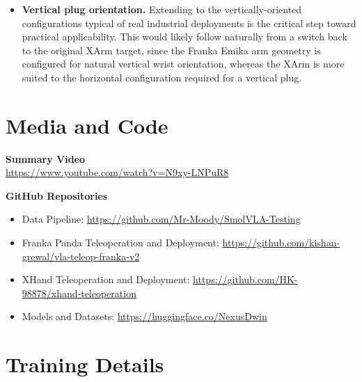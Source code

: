 \documentclass[conference]{IEEEtran}
\begin{document}
\begin{itemize}
    \item \textbf{Vertical plug orientation.} Extending to the vertically-oriented configurations typical of real industrial deployments is the critical step toward practical applicability. This would likely follow naturally from a switch back to the original XArm target, since the Franka Emika arm geometry is configured for natural vertical wrist orientation, whereas the XArm is more suited to the horizontal configuration required for a vertical plug. 
\end{itemize}

\printbibliography

\newpage
\onecolumn

\appendix
\section{Media and Code}

\noindent\textbf{Summary Video}\\
\url{https://www.youtube.com/watch?v=N9xy-LNPuR8}

\bigskip
\noindent\textbf{GitHub Repositories}
\begin{itemize}
    \item Data Pipeline: \url{https://github.com/Mr-Moody/SmolVLA-Testing}
    \item Franka Panda Teleoperation and Deployment: \url{https://github.com/kishan-grewal/vla-teleop-franka-v2}
    \item XHand Teleoperation and Deployment: \url{https://github.com/HK-98878/xhand-teleoperation}
    \item Models and Datasets: \url{https://huggingface.co/NexusDwin}
\end{itemize}

\bigskip



\section{Training Details}
\label{appendix:training}
\end{document}
